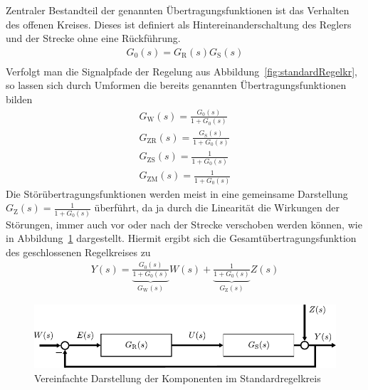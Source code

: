 %
Zentraler Bestandteil der genannten Übertragungsfunktionen ist das Verhalten des offenen Kreises. Dieses ist definiert als Hintereinanderschaltung des Reglers und der Strecke ohne eine Rückführung.
%
\begin{equation*}
\begin{aligned}
	G_{0}(s)=G_{\text{R}}(s)G_{\text{S}}(s)\\
	\end{aligned}
\end{equation*} 
%
Verfolgt man die Signalpfade der Regelung aus Abbildung~\ref{fig:standardRegelkr}, so lassen sich durch Umformen die bereits genannten Übertragungsfunktionen bilden 	
%
\begin{equation*}
	\begin{aligned}
		G_{\text{W}}(s)=\frac{G_{0}(s)}{1+G_{0}(s)}\\
		G_{\text{ZR}}(s)=\frac{G_{\text{S}}(s)}{1+G_{0}(s)}\\
		G_{\text{ZS}}(s)=\frac{1}{1+G_{0}(s)}\\
		G_{\text{ZM}}(s)=\frac{1}{1+G_{0}(s)}
	\end{aligned}
\end{equation*}  
%
Die Störübertragungsfunktionen werden meist in eine gemeinsame Darstellung $G_{\text{Z}}(s)=\frac{1}{1+G_{0}(s)}$ überführt, da ja durch die Linearität die Wirkungen der Störungen, immer auch vor oder nach der Strecke verschoben werden können, wie in Abbildung~\ref{fig:standardRegelkreinfach} dargestellt.
Hiermit ergibt sich die Gesamtübertragungsfunktion des geschlossenen Regelkreises zu
%
\begin{equation*}
\begin{aligned}
%
Y(s)=\underbrace{\frac{G_{0}(s)}{1+G_{0}(s)}}_{G_{\text{W}}(s)}W(s)+\underbrace{\frac{1}{1+G_{0}(s)}}_{G_{\text{Z}}(s)}Z(s)
%
\end{aligned}
\end{equation*}   
%
\begin{figure}[h!]
	\centering
	\includegraphics[width=0.95\linewidth]{Abbildungen/Systemanalyse/PDF/StandardregelkreisEinfach.pdf}
	\caption{Vereinfachte Darstellung der Komponenten im Standardregelkreis}
	\label{fig:standardRegelkreinfach}
\end{figure}
